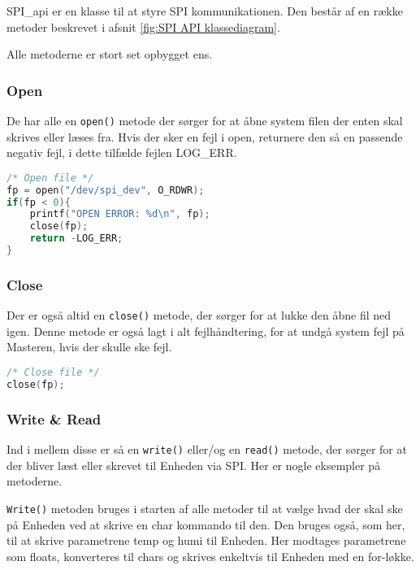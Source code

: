 
SPI\_api er en klasse til at styre SPI kommunikationen. Den består af en række metoder beskrevet i afsnit \ref{fig:SPI API klassediagram}.

Alle metoderne er stort set opbygget ens.

\subsubsection*{Open}

De har alle en \verb+open()+ metode der sørger for at åbne system filen der enten skal skrives eller læses fra. Hvis der sker en fejl i open, returnere den så en passende negativ fejl, i dette tilfælde fejlen LOG\_ERR.

\begin{lstlisting}[language=C]
/* Open file */
fp = open("/dev/spi_dev", O_RDWR);
if(fp < 0){
	printf("OPEN ERROR: %d\n", fp);
	close(fp);
	return -LOG_ERR;
}
\end{lstlisting}

\subsubsection*{Close}

Der er også altid en \verb+close()+ metode, der sørger for at lukke den åbne fil ned igen. Denne metode er også lagt i alt fejlhåndtering, for at undgå system fejl på Masteren, hvis der skulle ske fejl.

\begin{lstlisting}[language=C]
/* Close file */
close(fp);
\end{lstlisting}

\subsubsection*{Write \& Read}

Ind i mellem disse er så en \verb+write()+ eller/og en \verb+read()+ metode, der sørger for at der bliver læst eller skrevet til Enheden via SPI. Her er nogle eksempler på metoderne.

\verb+Write()+ metoden bruges i starten af alle metoder til at vælge hvad der skal ske på Enheden ved at skrive en char kommando til den. Den bruges også, som her, til at skrive parametrene temp og humi til Enheden. Her modtages parametrene som floats, konverteres til chars og skrives enkeltvis til Enheden med en for-løkke.

